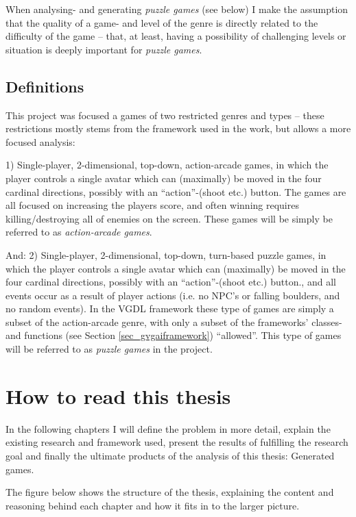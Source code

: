 \documentclass[a4paper,titlepage,final]{report}
\begin{document}
When analysing- and generating \textit{puzzle games} (see below) I make the assumption that the quality of a game- and level of the genre is directly related to the difficulty of the game -- that, at least, having a possibility of challenging levels or situation is deeply important for \textit{puzzle games}.

\subsection{Definitions}
This project was focused a games of two restricted genres and types -- these restrictions mostly stems from the framework used in the work, but allows a more focused analysis: 

1) Single-player, 2-dimensional, top-down, action-arcade games, in which the player controls a single avatar which can (maximally) be moved in the four cardinal directions, possibly with an ``action''-(shoot etc.) button.
The games are all focused on increasing the players score, and often winning requires killing/destroying all of enemies on the screen.
These games will be simply be referred to as \textit{action-arcade games}.

And: 2) Single-player, 2-dimensional, top-down, turn-based puzzle games, in which the player controls a single avatar which can (maximally) be moved in the four cardinal directions, possibly with an ``action''-(shoot etc.) button., and all events occur as a result of player actions (i.e. no NPC's or falling boulders, and no random events). 
In the VGDL framework these type of games are simply a subset of the action-arcade genre, with only a subset of the frameworks' classes- and functions (see Section \ref{sec_gvgaiframework}) ``allowed''.
This type of games will be referred to as \textit{puzzle games} in the project.


\section{How to read this thesis}
\label{sec_howtoread}
In the following chapters I will define the problem in more detail, explain the existing research and framework used, present the results of fulfilling the research goal and finally the ultimate products of the analysis of this thesis: Generated games.

The figure below shows the structure of the thesis, explaining the content and reasoning behind each chapter and how it fits in to the larger picture.
\end{document}
